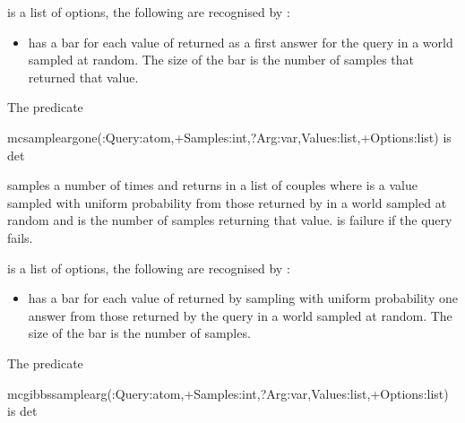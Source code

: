 \documentclass[letterpaper,10pt,english]{sphinxmanual}
\begin{document}
 is a list of options, the following are recognised by :
\begin{itemize}
\item {} 
  has a bar for each value of  returned as a first answer for the query in a world sampled at random. The size of the bar is the number of samples that returned that value.

\end{itemize}

The predicate

\begin{sphinxVerbatim}[commandchars=\\\{\}]
mc\PYGZus{}sample\PYGZus{}arg\PYGZus{}one(:Query:atom,+Samples:int,?Arg:var,\PYGZhy{}Values:list,+Options:list) is det
\end{sphinxVerbatim}

samples  a number of  times and returns in  a list of couples  where  is a value sampled with uniform probability from those returned by  in a world sampled at random and  is the number of samples returning that value.
 is failure if the query fails.

 is a list of options, the following are recognised by :
\begin{itemize}
\item {} 
  has a bar for each value of  returned by sampling with uniform probability one answer from those returned by the query in a world sampled at random. The size of the bar is the number of samples.

\end{itemize}

The predicate

\begin{sphinxVerbatim}[commandchars=\\\{\}]
mc\PYGZus{}gibbs\PYGZus{}sample\PYGZus{}arg(:Query:atom,+Samples:int,?Arg:var,\PYGZhy{}Values:list,+Options:list) is det
\end{sphinxVerbatim}
\end{document}
